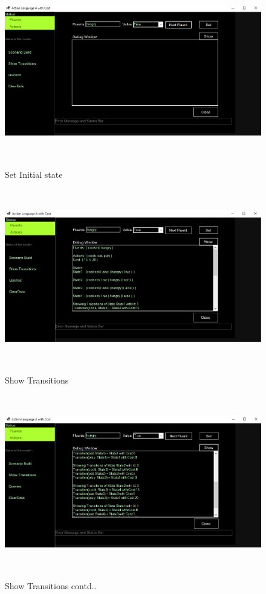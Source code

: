 \documentclass[11pt]{article}
\begin{document}
	\begin{figure}[H]
		\centering
		\includegraphics[width=6in,height=3in]{./testImages/Example3/img4.png}
		\label{Figure:f03.4}
		\caption{Set Initial state}
	\end{figure}
	\begin{figure}[H]
		\centering
		\includegraphics[width=6in,height=3in]{./testImages/Example3/img5.png}
		\label{Figure:f03.5}
		\caption{Show Transitions}
	\end{figure}
		\begin{figure}[H]
		\centering
		\includegraphics[width=6in,height=3in]{./testImages/Example3/img6.png}
		\label{Figure:f03.6}
		\caption{Show Transitions contd..}
	\end{figure}
\end{document}
